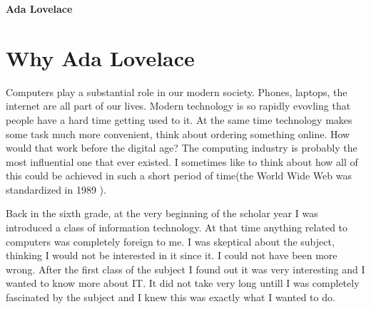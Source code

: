 \documentclass{article}
\begin{document}
\begin{titlepage}
    \centering
    \begin{center}
        {\Large \textbf{Ada Lovelace}}\\
        \vfill
    \end{center}
\end{titlepage}


\tableofcontents
\newpage

\section{Why Ada Lovelace}

Computers play a substantial role in our modern society. Phones, laptops, the internet are all part of our lives. Modern technology is so rapidly evovling that people have a hard time getting used to it. At the same time technology makes some task much more convenient, think about ordering something online. How would that work before the digital age? The computing industry is probably the most influential one that ever existed. I sometimes like to think about how all of this could be achieved in such a short period of time(the World Wide Web was standardized in 1989 \cite{TheInternet}).

\vspace{0.3cm}

Back in the sixth grade, at the very beginning of the scholar year I was introduced a class of information technology. At that time anything related to computers was completely foreign to me. I was skeptical about the subject, thinking I would not be interested in it since it. I could not have been more wrong. After the first class of the subject I found out it was very interesting and I wanted to know more about IT. It did not take very long untill I was completely fascinated by the subject and I knew this was exactly what I wanted to do.
\end{document}
